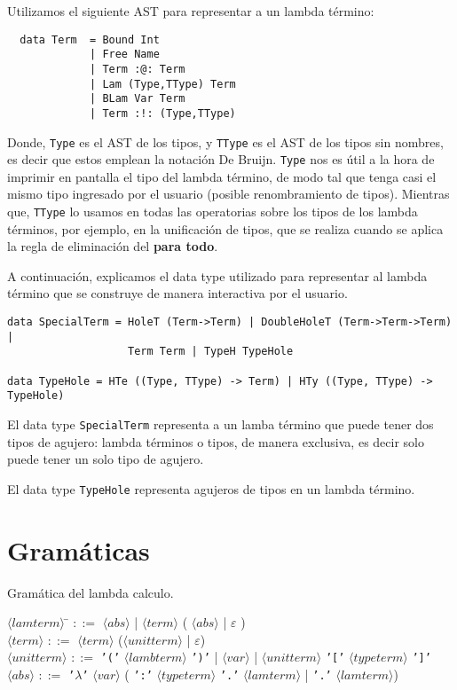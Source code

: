 \documentclass[a4paper,11pt]{article}
\begin{document}
Utilizamos el siguiente AST para representar a un lambda término:
\begin{verbatim}
  data Term  = Bound Int
             | Free Name 
             | Term :@: Term
             | Lam (Type,TType) Term
             | BLam Var Term
             | Term :!: (Type,TType)
\end{verbatim}
  
Donde, \texttt{Type} es el AST de los tipos, y \texttt{TType} es el AST de los tipos sin nombres, es decir que estos emplean la notación De Bruijn.
\texttt{Type} nos es útil a la hora de imprimir en pantalla el tipo del lambda término, de modo tal que tenga casi el mismo tipo ingresado por el usuario 
(posible renombramiento de tipos).
Mientras que, \texttt{TType} lo usamos en todas las operatorias sobre los tipos de los lambda términos, por ejemplo, en la unificación de tipos, que
se realiza cuando se aplica la regla de eliminación del \textbf{para todo}.

A continuación, explicamos el data type utilizado para representar al lambda término que se construye de manera interactiva por el usuario.

\begin{verbatim}
data SpecialTerm = HoleT (Term->Term) | DoubleHoleT (Term->Term->Term) |
                   Term Term | TypeH TypeHole

data TypeHole = HTe ((Type, TType) -> Term) | HTy ((Type, TType) -> TypeHole)
\end{verbatim}

El data type \texttt{SpecialTerm} representa a un lamba término que puede tener dos tipos de agujero: lambda términos o tipos, de manera
exclusiva, es decir solo puede tener un solo tipo de agujero.

El data type \texttt{TypeHole} representa agujeros de tipos en un lambda término.

\section{Gramáticas}
 Gramática del lambda calculo.

\begin{tabbing}
$\langle lamterm \rangle$ \= $::=$ $\langle abs \rangle$ | $\langle term \rangle$ ( $\langle abs \rangle$ | $\varepsilon$ ) \\

$\langle term \rangle$ \> $::=$ $\langle term \rangle$ ($\langle unitterm \rangle$ | $\varepsilon$) \\

$\langle unitterm \rangle$ \> $::=$ \texttt{'('} $\langle lambterm \rangle$ \texttt{')'} |
$\langle var \rangle$ | $\langle unitterm \rangle$ \texttt{'['} $\langle typeterm \rangle$ \texttt{']'}\\

$\langle abs \rangle$ \> $::=$ \texttt{'$\lambda$'} $\langle var \rangle$ ( \texttt{':'} $\langle typeterm \rangle$ \texttt{'.'} $\langle lamterm \rangle$
| \texttt{'.'} $\langle lamterm \rangle$)
\end{tabbing}
\end{document}
